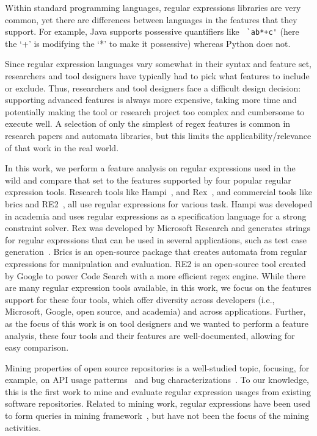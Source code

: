 Within standard programming languages, regular expressions libraries are very common, yet there are  differences between languages in the features that they support. For example, Java supports possessive quantifiers like \verb! `ab*+c'! (here the `+' is modifying the `*' to make it possessive) whereas Python does not.

Since  regular expression languages vary somewhat in their syntax and feature set, researchers and tool designers have typically had to pick what features to include or exclude. Thus, researchers and tool designers face a difficult design decision: supporting advanced features is always more expensive, taking more time and potentially making the tool or research project too complex and cumbersome to execute well.  A selection of only the simplest of regex features is common in research papers and automata libraries, but this limits the applicability/relevance of that work in the real world.



In this work, we perform a feature analysis on regular expressions used in the wild and compare that set to the features supported by four popular regular expression tools.
Research tools like Hampi~\cite{hampi}, and Rex~\cite{rex}, and commercial tools like brics\cite{brics} and RE2~\cite{re2}, all use regular expressions for various task. Hampi was developed  in academia and uses regular expressions as a specification language for a strong constraint solver. Rex was developed by Microsoft Research and generates strings for regular expressions that can be used in several applications, such as test case generation~\cite{Anand:2013:OSM:2503903.2503991, Tillmann:2014:TAT:2642937.2642941}. Brics is an open-source package that creates automata from regular expressions for manipulation and evaluation.
RE2 is an open-source tool created by Google to power Code Search with a more efficient regex engine.
While there are many regular expression tools available, in this work, we focus on the features support for these four tools, which offer diversity across developers (i.e., Microsoft, Google, open source, and academia) and across applications. Further, as the focus of this work is on tool designers and we wanted to perform a feature analysis, these four tools and their features are well-documented, allowing for easy comparison.

Mining properties of open source repositories is a well-studied topic, focusing, for example, on API usage patterms~\cite{Linares-Vasquez:2014:MEA:2597073.2597085} and bug characterizations~\cite{Chen:2014:ESD:2597073.2597108}.
To our knowledge, this is the first work to mine and evaluate regular expression usages from existing software repositories. Related to mining work, regular expressions have been used to form queries in mining framework~\cite{Begel:2010:CDE:1806799.1806821}, but have not been the focus of the mining activities.

